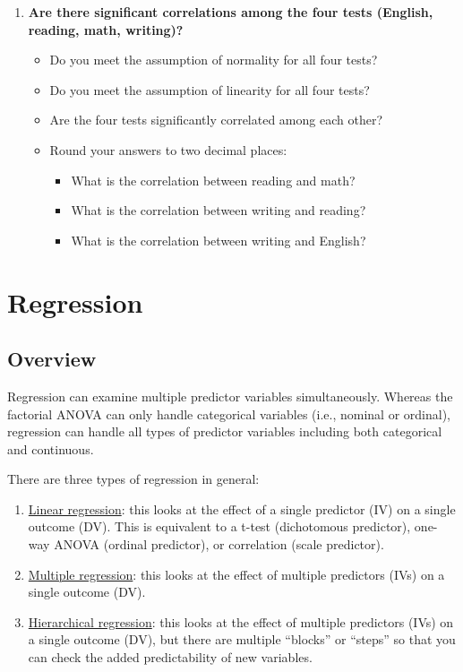 \documentclass[
]{book}
\begin{document}
\begin{enumerate}
\def\labelenumi{\arabic{enumi}.}
\item
  \textbf{Are there significant correlations among the four tests (English, reading, math, writing)?}

  \begin{itemize}
  \item
    Do you meet the assumption of normality for all four tests?
  \item
    Do you meet the assumption of linearity for all four tests?
  \item
    Are the four tests significantly correlated among each other?
  \item
    Round your answers to two decimal places:

    \begin{itemize}
    \item
      What is the correlation between reading and math?
    \item
      What is the correlation between writing and reading?
    \item
      What is the correlation between writing and English?
    \end{itemize}
  \end{itemize}
\end{enumerate}

\hypertarget{regression}{%
\section{Regression}\label{regression}}

\hypertarget{overview-11}{%
\subsection{Overview}\label{overview-11}}

Regression can examine multiple predictor variables simultaneously. Whereas the factorial ANOVA can only handle categorical variables (i.e., nominal or ordinal), regression can handle all types of predictor variables including both categorical and continuous.

There are three types of regression in general:

\begin{enumerate}
\def\labelenumi{\arabic{enumi}.}
\item
  \underline{Linear regression}: this looks at the effect of a single predictor (IV) on a single outcome (DV). This is equivalent to a t-test (dichotomous predictor), one-way ANOVA (ordinal predictor), or correlation (scale predictor).
\item
  \underline{Multiple regression}: this looks at the effect of multiple predictors (IVs) on a single outcome (DV).
\item
  \underline{Hierarchical regression}: this looks at the effect of multiple predictors (IVs) on a single outcome (DV), but there are multiple ``blocks'' or ``steps'' so that you can check the added predictability of new variables.
\end{enumerate}
\end{document}
